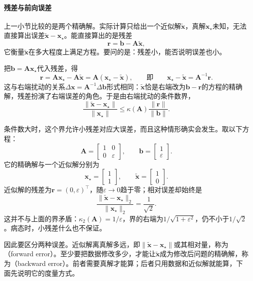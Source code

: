 \paragraph{残差与前向误差}
上一小节比较的是两个精确解。实际计算只给出一个近似解$\tilde{\bm x}$，真解$\bm x_\star$未知，无法直接算出误差$\tilde{\bm x}-\bm x_\star$。能直接算出的是残差
\[
 \bm r=\bm b-\bm A\tilde{\bm x},
\]
它衡量$\tilde{\bm x}$在多大程度上满足方程。要问的是：残差小，能否说明误差也小。

把$\bm b=\bm A\bm x_\star$代入残差，得
\begin{equation}
 \bm r=\bm A\bm x_\star-\bm A\tilde{\bm x}=\bm A(\bm x_\star-\tilde{\bm x}),\qquad\text{即}\qquad \bm x_\star-\tilde{\bm x}=\bm A^{-1}\bm r .
 \label{eq:ls-error-residual-identity}
\end{equation}
这与右端扰动的关系$\Delta\bm x=\bm A^{-1}\Delta\bm b$形式相同：$\tilde{\bm x}$恰是右端改为$\bm b-\bm r$的方程的精确解，残差扮演了右端误差的角色。于是由右端扰动的条件数界，
\begin{equation}
 \frac{\lVert\tilde{\bm x}-\bm x_\star\rVert}{\lVert\bm x_\star\rVert}\leq\kappa(\bm A)\frac{\lVert\bm r\rVert}{\lVert\bm b\rVert}.
 \label{eq:ls-residual-error-bound}
\end{equation}

条件数大时，这个界允许小残差对应大误差，而且这种情形确实会发生。取以下方程：
\[
 \bm A=\begin{bmatrix}1&0\\0&\varepsilon\end{bmatrix},\qquad
 \bm b=\begin{bmatrix}1\\\varepsilon\end{bmatrix}.
\]
它的精确解与一个近似解分别为
\[
 \bm x_\star=\begin{bmatrix}1\\1\end{bmatrix},\qquad
 \tilde{\bm x}=\begin{bmatrix}1\\0\end{bmatrix}.
\]
近似解的残差为$\bm r=(0,\varepsilon)^\top$，随$\varepsilon\to0$趋于零；相对误差却始终是
\[
 \frac{\lVert\tilde{\bm x}-\bm x_\star\rVert_2}{\lVert\bm x_\star\rVert_2}=\frac1{\sqrt2}.
\]
这并不与上面的界矛盾：$\kappa_2(\bm A)=1/\varepsilon$，界的右端为$1/\sqrt{1+\varepsilon^2}$，仍不小于$1/\sqrt2$。病态时，小残差什么也不保证。

因此要区分两种误差。近似解离真解多远，即$\lVert\tilde{\bm x}-\bm x_\star\rVert$或其相对量，称为（forward error）。至少要把数据修改多少，才能让$\tilde{\bm x}$成为修改后问题的精确解，称为（backward error）。前者需要真解才能算；后者只用数据和近似解就能算，下面先说明它的度量方式。


